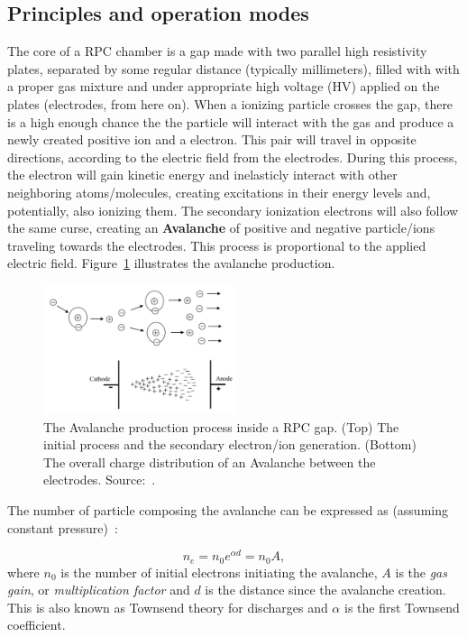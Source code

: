 \subsection{Principles and operation modes}

The core of a RPC chamber is a gap made with two parallel high resistivity plates, separated by some regular distance (typically millimeters), filled with with a proper gas mixture and under appropriate high voltage (HV) applied on the plates (electrodes, from here on). When a ionizing particle crosses the gap, there is a high enough chance the the particle will interact with the gas and produce a newly created positive ion and a electron. This pair will travel in opposite directions, according to the electric field from the electrodes. During this process, the electron will gain kinetic energy and inelasticly interact with other neighboring atoms/molecules, creating excitations in their energy levels and, potentially, also ionizing them. The secondary ionization electrons will also follow the same curse, creating an \textbf{Avalanche} of positive and negative particle/ions traveling towards the electrodes. This process is proportional to the applied electric field. Figure~\ref{avalanche} illustrates the avalanche production.


\begin{figure}[h]
    \begin{center}
    \includegraphics[width=0.5\textwidth,keepaspectratio]{figures/rpc/avalanche_prod.png}
    \end{center}
    \caption{The Avalanche production process inside a RPC gap. (Top) The initial process and the secondary electron/ion generation. (Bottom) The overall charge distribution of an Avalanche between the electrodes. Source:~\cite{livro_descarga}.}
    \label{avalanche}
\end{figure}

The number of particle composing the avalanche can be expressed as (assuming constant pressure)~\cite{livro_descarga}:

\begin{equation}
    n_{e}=n_{0}e^{\alpha d} = n_{0}A,
\end{equation}
where $n_{0}$ is the number of initial electrons initiating the avalanche, $A$ is the \textit{gas gain}, or \textit{multiplication factor} and $d$ is the distance since the avalanche creation. This is also known as Townsend theory for discharges and $\alpha$ is the first Townsend coefficient.

